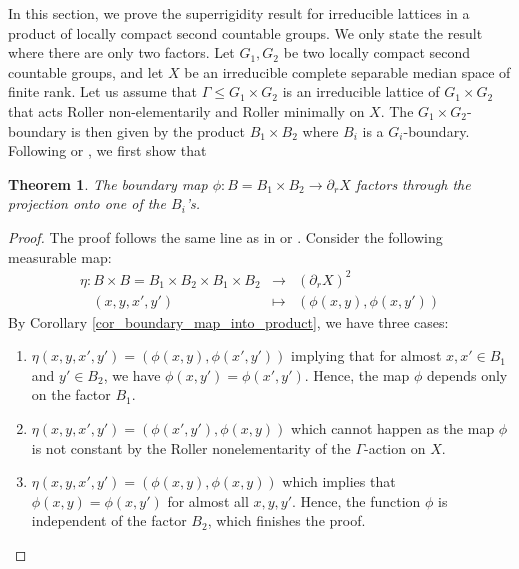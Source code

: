 \documentclass{amsart}
\numberwithin{equation}{section}
\newtheorem{thm}{Theorem}[section]
\theoremstyle{definition}
\begin{document}
In this section, we prove the superrigidity result for irreducible lattices in a product of locally compact second countable groups. We only state the result where there are only two factors. Let $G_1, G_2$ be two locally compact second countable groups, and let $X$ be an irreducible complete separable median space of finite rank. Let us assume that $\Gamma\leq G_1\times G_2$ is an irreducible lattice of $G_1 \times G_2$ that acts Roller non-elementarily and Roller minimally on $X$. The $G_1\times G_2$-boundary is then given by the product $B_1\times B_2$ where $B_i$ is a $G_i$-boundary. Following \cite{BaderFurman} or \cite{BCFS}, we first show that
\begin{thm}\label{thm_factor_boundary_map}
    The boundary map $\phi: B=B_1\times B_2 \rightarrow \partial_r X$ factors through the projection onto one of the $B_i$'s.
\end{thm}
\begin{proof}
    The proof follows the same line as in \cite{BaderFurman} or \cite{BCFS}. Consider the following measurable map:
    \begin{eqnarray*}
    \eta: B \times B = B_1\times B_2 \times B_1 \times B_2 &\rightarrow & (\partial_r X)^2\\
\ \ \ \ (x,y,x',y') &\mapsto & (\phi(x,y),\phi(x,y'))
    \end{eqnarray*}
 By Corollary \ref{cor_boundary_map_into_product}, we have three cases:
 \begin{enumerate}
     \item $\eta(x,y,x',y')=(\phi(x,y),\phi(x',y'))$ implying that for almost $x,x'\in B_1$ and $y' \in B_2$, we have $\phi(x,y')=\phi(x',y')$. Hence, the map $\phi$ depends only on the factor $B_1$.
     \item $\eta(x,y,x',y')=(\phi(x',y'),\phi(x,y))$ which cannot happen as the map $\phi$ is not constant by the Roller nonelementarity of the $\Gamma$-action on $X$.
     \item $\eta(x,y,x',y')=(\phi(x,y),\phi(x,y))$ which implies that $\phi(x,y)=\phi(x,y')$ for almost all $x,y,y'$. Hence, the function $\phi$ is independent of the factor $B_2$, which finishes the proof.
 \end{enumerate}
 
\end{proof}
\end{document}
